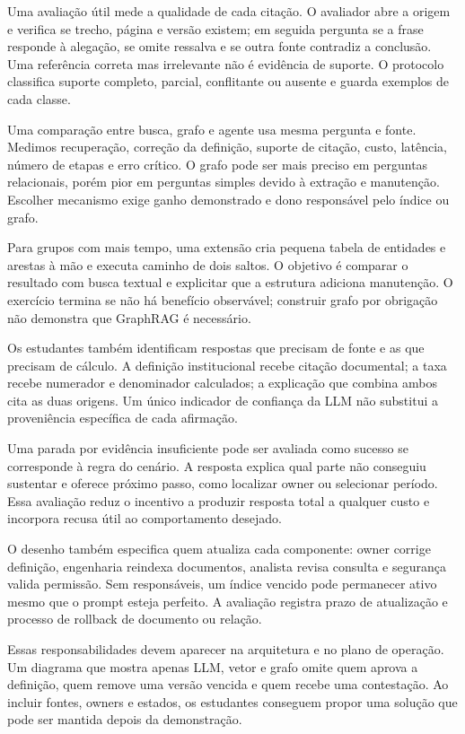 Uma avaliação útil mede a qualidade de cada citação. O avaliador abre a origem e verifica se trecho, página e versão existem; em seguida pergunta se a frase responde à alegação, se omite ressalva e se outra fonte contradiz a conclusão. Uma referência correta mas irrelevante não é evidência de suporte. O protocolo classifica suporte completo, parcial, conflitante ou ausente e guarda exemplos de cada classe.

Uma comparação entre busca, grafo e agente usa mesma pergunta e fonte. Medimos recuperação, correção da definição, suporte de citação, custo, latência, número de etapas e erro crítico. O grafo pode ser mais preciso em perguntas relacionais, porém pior em perguntas simples devido à extração e manutenção. Escolher mecanismo exige ganho demonstrado e dono responsável pelo índice ou grafo.



Para grupos com mais tempo, uma extensão cria pequena tabela de entidades e arestas à mão e executa caminho de dois saltos. O objetivo é comparar o resultado com busca textual e explicitar que a estrutura adiciona manutenção. O exercício termina se não há benefício observável; construir grafo por obrigação não demonstra que GraphRAG é necessário.

Os estudantes também identificam respostas que precisam de fonte e as que precisam de cálculo. A definição institucional recebe citação documental; a taxa recebe numerador e denominador calculados; a explicação que combina ambos cita as duas origens. Um único indicador de confiança da LLM não substitui a proveniência específica de cada afirmação.

Uma parada por evidência insuficiente pode ser avaliada como sucesso se corresponde à regra do cenário. A resposta explica qual parte não conseguiu sustentar e oferece próximo passo, como localizar owner ou selecionar período. Essa avaliação reduz o incentivo a produzir resposta total a qualquer custo e incorpora recusa útil ao comportamento desejado.

O desenho também especifica quem atualiza cada componente: owner corrige definição, engenharia reindexa documentos, analista revisa consulta e segurança valida permissão. Sem responsáveis, um índice vencido pode permanecer ativo mesmo que o prompt esteja perfeito. A avaliação registra prazo de atualização e processo de rollback de documento ou relação.

Essas responsabilidades devem aparecer na arquitetura e no plano de operação. Um diagrama que mostra apenas LLM, vetor e grafo omite quem aprova a definição, quem remove uma versão vencida e quem recebe uma contestação. Ao incluir fontes, owners e estados, os estudantes conseguem propor uma solução que pode ser mantida depois da demonstração.

